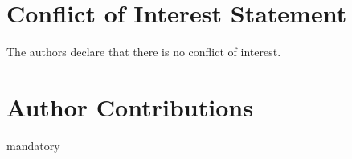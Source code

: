 \documentclass[utf8]{frontiersSCNS} %
\begin{document}




\section*{Conflict of Interest Statement}
The authors declare that there is no conflict of interest.

\section*{Author Contributions}
mandatory
\end{document}
